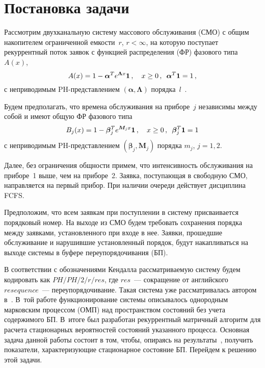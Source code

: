       \begin{multicols}{2}

      \label{st\stat}

\section{Постановка задачи}

Рассмотрим двухканальную систему массового обслуживания (СМО) с общим накопителем ограниченной емкости~$r$, 
$r<\infty$, на которую поступает рекуррентный поток заявок с функцией распределения (ФР) фазового типа~$A(x)$,
\begin{equation*}
A(x)=1-\boldsymbol{\alpha}^T e^{\boldsymbol{\Lambda}x}\mathbf{1}\,, \quad
x\geq 0\,,\enskip \boldsymbol{\alpha}^T\mathbf{1}=1\,,
\end{equation*}
с неприводимым PH-представлением $(\boldsymbol{\alpha},\boldsymbol{\Lambda})$ порядка~$l$~\cite{1mat}.

Будем предполагать, что времена обслуживания на приборе~$j$ независимы  между собой и имеют общую 
ФР фазового типа
\begin{equation*}
B_j(x)=1-\boldsymbol{\beta}_j^T e^{\boldsymbol{M}_j x}\mathbf{1}\,, \quad
x\geq 0\,,\enskip \boldsymbol{\beta}_j^T\boldsymbol{1}=1
\end{equation*}
с неприводимым PH-представлением $(\boldsymbol{\beta}_j,\boldsymbol{M}_j)$ порядка $m_j$, $j=1,2$.

Далее, без ограничения общности примем, что интенсивность обслуживания на приборе~1 выше, чем на приборе~2. 
Заявка, поступающая в свободную СМО, направляется на первый прибор. При наличии очереди действует дисциплина FCFS.

Предположим, что всем заявкам при поступлении в систему присваивается порядковый номер. На выходе из СМО 
будем требовать сохранения порядка между заявками, установленного при входе в нее. Заявки, прошедшие 
обслуживание и нарушившие установленный порядок, будут накапливаться на выходе системы в  буфере 
переупорядочивания (БП).

В соответствии с обозначениями Кендалла рассматриваемую систему будем кодировать как $PH/PH/2/r/res$, 
где $res$~--- сокращение от английского $resequence$~--- переупорядочивание. Такая сис\-те\-ма уже 
рассматривалась автором в~\cite{2mat}. В~той работе функционирование системы описывалось однородным 
марковским процессом (ОМП) над пространством состояний без учета содержимого БП. В~итоге был разработан 
рекуррентный матричный алгоритм для расчета стационарных вероятностей состояний указанного процесса. 
Основная задача данной работы состоит в том, чтобы, опираясь на результаты~\cite{2mat}, 
получить показатели, характеризующие стационарное состояние БП. Перейдем к решению этой задачи.


\end{multicols}
